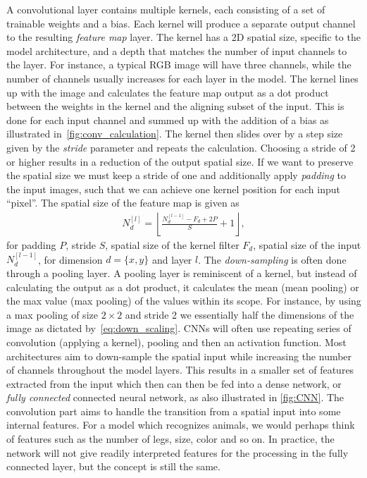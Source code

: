 A convolutional layer contains multiple kernels, each consisting of a set of
trainable weights and a bias. Each kernel will produce a separate output channel
to the resulting \textit{feature map} layer. The kernel has a 2D spatial size,
specific to the model architecture, and a depth that matches the number of input
channels to the layer. For instance, a typical RGB image will have three
channels, while the number of channels usually increases for each layer in the
model. The kernel lines up with the image and calculates the feature map output
as a dot product between the weights in the kernel and the aligning subset of
the input. This is done for each input channel and summed up with the addition
of a bias as illustrated in~\cref{fig:conv_calculation}. The kernel then slides over by a
step size given by the \textit{stride} parameter and repeats the
calculation. Choosing a stride of 2 or higher results in a reduction of the
output spatial size. If we want to preserve the spatial size we must keep a
stride of one and additionally apply \textit{padding} to the input images, such
that we can achieve one kernel position for each input ``pixel''. The spatial
size of the feature map is given as
\begin{align}
  N_d^{[l]} = \left\lfloor \frac{N_d^{[l-1]} - F_d + 2P}{S} + 1 \right\rfloor,
  \label{eq:down_scaling}
\end{align}
for padding $P$, stride $S$, spatial size of the kernel filter $F_d$, spatial
size of the input $N_d^{[l-1]}$, for dimension $d = \{x, y\}$ and layer $l$. The
\textit{down-sampling} is often done through a pooling layer. A pooling layer is
reminiscent of a kernel, but instead of calculating the output as a dot product,
it calculates the mean (mean pooling) or the max value (max pooling) of the
values within its scope. For instance, by using a max pooling of size $2 \times
2$ and stride 2 we essentially half the dimensions of the image as dictated
by~\cref{eq:down_scaling}. \acrshort{CNN}s will often use repeating series of
convolution (applying a kernel), pooling and then an activation function. Most
architectures aim to down-sample the spatial input while increasing the number
of channels throughout the model layers. This results in a smaller set of
features extracted from the input which then can then be fed into a dense
network, or \textit{fully connected} connected neural network, as also
illustrated in \cref{fig:CNN}. The convolution part aims to
handle the transition from a spatial input into some internal features. For a model which recognizes animals, we would perhaps think of features such as the number of legs, size, color and so on. In practice, the network will not give readily interpreted features for the processing in the fully connected layer, but the concept is still the same. 


